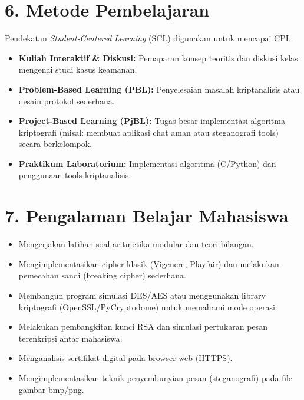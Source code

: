 \documentclass[12pt,a4paper]{article}
\begin{document}
\vspace{0.5cm}

\section*{6. Metode Pembelajaran}

Pendekatan \textit{Student-Centered Learning} (SCL) digunakan untuk mencapai CPL:
\begin{itemize}[leftmargin=*]
  \item \textbf{Kuliah Interaktif \& Diskusi:} Pemaparan konsep teoritis dan diskusi kelas mengenai studi kasus keamanan.
  \item \textbf{Problem-Based Learning (PBL):} Penyelesaian masalah kriptanalisis atau desain protokol sederhana.
  \item \textbf{Project-Based Learning (PjBL):} Tugas besar implementasi algoritma kriptografi (misal: membuat aplikasi chat aman atau steganografi tools) secara berkelompok.
  \item \textbf{Praktikum Laboratorium:} Implementasi algoritma (C/Python) dan penggunaan tools kriptanalisis.
\end{itemize}

\vspace{0.5cm}

\section*{7. Pengalaman Belajar Mahasiswa}

\begin{itemize}[leftmargin=*]
  \item Mengerjakan latihan soal aritmetika modular dan teori bilangan.
  \item Mengimplementasikan cipher klasik (Vigenere, Playfair) dan melakukan pemecahan sandi (breaking cipher) sederhana.
  \item Membangun program simulasi DES/AES atau menggunakan library kriptografi (OpenSSL/\allowbreak PyCryptodome) untuk memahami mode operasi.
  \item Melakukan pembangkitan kunci RSA dan simulasi pertukaran pesan terenkripsi antar mahasiswa.
  \item Menganalisis sertifikat digital pada browser web (HTTPS).
  \item Mengimplementasikan teknik penyembunyian pesan (steganografi) pada file gambar bmp/png.
\end{itemize}
\end{document}
